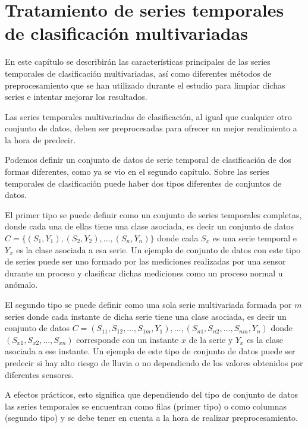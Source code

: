 \chapter{Tratamiento de series temporales de clasificación multivariadas}
En este capítulo se describirán las características principales de las series temporales de clasificación multivariadas, así como diferentes métodos de preprocesamiento que se han utilizado durante el estudio para limpiar dichas series e intentar mejorar los resultados.\newline

Las series temporales multivariadas de clasificación, al igual que cualquier otro conjunto de datos, deben ser preprocesadas para ofrecer un mejor rendimiento a la hora de predecir.\newline

Podemos definir un conjunto de datos de serie temporal de clasificación de dos formas diferentes, como ya se vio en el segundo capítulo. Sobre las series temporales de clasificación puede haber dos tipos diferentes de conjuntos de datos.\newline

El primer tipo se puede definir como un conjunto de series temporales completas, donde cada una de ellas tiene una clase asociada, es decir un conjunto de datos $C = \{ (S_1,Y_1), (S_2,Y_2), ..., (S_n,Y_n)\}$ donde cada $S_x$ es una serie temporal e $Y_x$ es la clase asociada a esa serie. Un ejemplo de conjunto de datos con este tipo de series puede ser uno formado por las mediciones realizadas por una sensor durante un proceso y clasificar dichas mediciones como un proceso normal u anómalo.\newline

El segundo tipo se puede definir como una sola serie multivariada formada por $m$ series donde cada instante de dicha serie tiene una clase asociada, es decir un conjunto de datos $C = {(S_{11},S_{12},...,S_{1m},Y_1),..., (S_{n1},S_{n2},...,S_{nm},Y_n)}$ donde $(S_{x1},S_{x2},...,S_{xn})$ corresponde con un instante $x$ de la serie y $Y_x$ es la clase asociada a ese instante. Un ejemplo de este tipo de conjunto de datos puede ser predecir si hay alto riesgo de lluvia o no dependiendo de los valores obtenidos por diferentes sensores.\newline

A efectos prácticos, esto significa que dependiendo del tipo de conjunto de datos las series temporales se encuentran como filas (primer tipo) o como columnas (segundo tipo) y se debe tener en cuenta a la hora de realizar preprocesamiento.\newline

